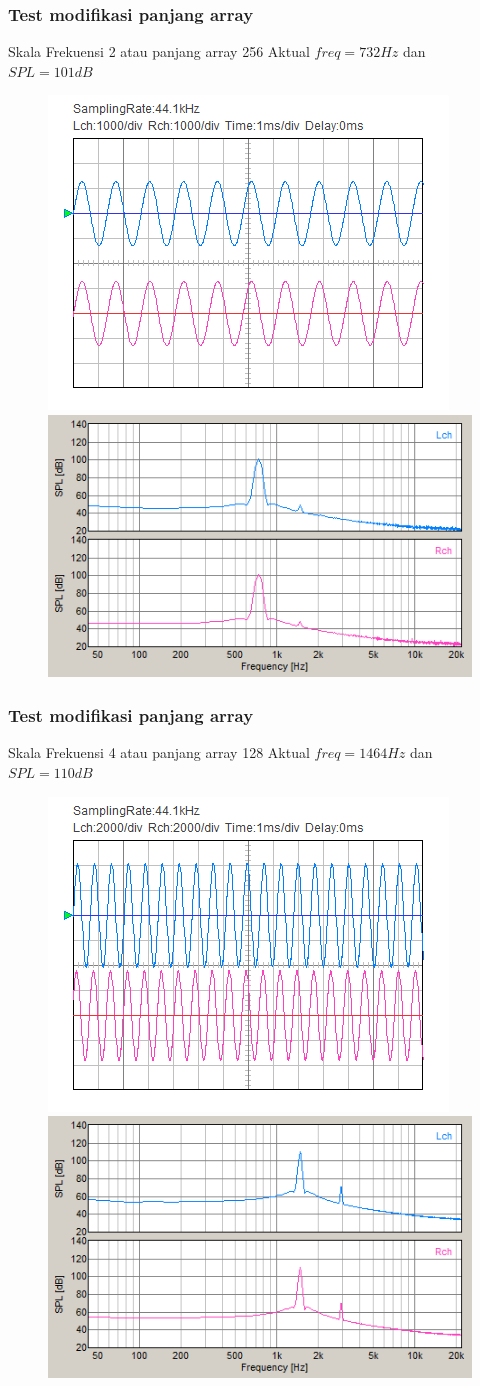 \documentclass[table,dvipsnames,10pt]{beamer}
\begin{document}
	\begin{frame}[fragile]
	\frametitle{Test modifikasi panjang array}
	\begin{exampleblock}{Skala Frekuensi 2 atau panjang array 256}
		Aktual $freq = 732 Hz$ dan $SPL = 101 dB$
		\begin{figure}[H]
			\centering
			\includegraphics[width=0.4\linewidth]{result/day_4/osi_sine2}
			\includegraphics[width=0.45\linewidth]{result/day_4/fft_sine2}
		\end{figure}
	\end{exampleblock}
	\end{frame}

	\begin{frame}[fragile]
	\frametitle{Test modifikasi panjang array}
	\begin{exampleblock}{Skala Frekuensi 4 atau panjang array 128}
		Aktual $freq = 1464 Hz$ dan $SPL = 110 dB$
		\begin{figure}[H]
			\centering
			\includegraphics[width=0.4\linewidth]{result/day_4/osi_sine4}
			\includegraphics[width=0.45\linewidth]{result/day_4/fft_sine4}
		\end{figure}
	\end{exampleblock}
	\end{frame}
\end{document}
